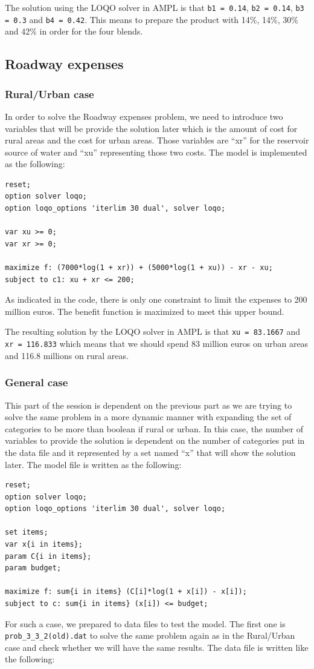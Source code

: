The solution using the LOQO solver in AMPL is that \texttt{b1 = 0.14}, \texttt{b2 = 0.14}, \texttt{b3 = 0.3} and \texttt{b4 = 0.42}. This means to prepare the product with 14\%, 14\%, 30\% and 42\% in order for the four blends.

\subsection{Roadway expenses}
\subsubsection{Rural/Urban case}
In order to solve the Roadway expenses problem, we need to introduce two variables that will be provide the solution later which is the amount of cost for rural areas and the cost for urban areas. Those variables are ``xr'' for the reservoir source of water and ``xu'' representing those two costs. The model is implemented as the following:
\begin{verbatim}
reset;
option solver loqo;
option loqo_options 'iterlim 30 dual', solver loqo;

var xu >= 0;
var xr >= 0;

maximize f: (7000*log(1 + xr)) + (5000*log(1 + xu)) - xr - xu;
subject to c1: xu + xr <= 200;
\end{verbatim}
As indicated in the code, there is only one constraint to limit the expenses to 200 million euros. The benefit function is maximized to meet this upper bound.

The resulting solution by the LOQO solver in AMPL is that \texttt{xu = 83.1667} and \texttt{xr = 116.833} which means that we should spend 83 million euros on urban areas and 116.8 millions on rural areas.

\subsubsection{General case}
This part of the session is dependent on the previous part as we are trying to solve the same problem in a more dynamic manner with expanding the set of categories to be more than boolean if rural or urban. In this case, the number of variables to provide the solution is dependent on the number of categories put in the data file and it represented by a set named ``x'' that will show the solution later. The model file is written as the following:
\begin{verbatim}
reset;
option solver loqo;
option loqo_options 'iterlim 30 dual', solver loqo;

set items;
var x{i in items};
param C{i in items};
param budget;

maximize f: sum{i in items} (C[i]*log(1 + x[i]) - x[i]);
subject to c: sum{i in items} (x[i]) <= budget;
\end{verbatim}
For such a case, we prepared to data files to test the model. The first one is \texttt{prob\_3\_3\_2(old).dat} to solve the same problem again as in the Rural/Urban case and check whether we will have the same results. The data file is written like the following:

